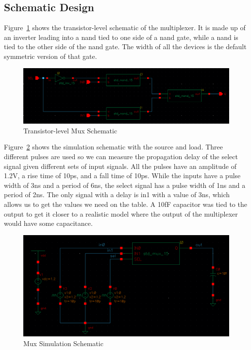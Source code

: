 \documentclass[12pt]{article}
\begin{document}
\subsection{Schematic Design}
Figure~\ref{fig:schem} shows the transistor-level schematic of the multiplexer.
It is made up of an inverter leading into a nand tied to one side of a nand gate,
while a nand is tied to the other side of the nand gate. The width of all the devices is the
default symmetric version of that gate.
\begin{figure}[!htb]
  \centering
  \includegraphics[width=5in]{figures/schem.png}
  \caption{Transistor-level Mux Schematic}\label{fig:schem}
\end{figure}
Figure~\ref{fig:sim} shows the simulation schematic with the source and load. 
Three different pulses are used so we can measure the propagation delay of the select signal
given different sets of input signals. All the pulses have an amplitude of 1.2V, a rise time of
10ps, and a fall time of 10ps.
While the inputs have a pulse width of 3ns and a period of 6ns, the select signal has a pulse width of 1ns and a
period of 2ns. The only signal with a delay is in1 with a value of 3ns, which allows us to get the values we need
on the table.
A 10fF capacitor was tied to the output to get it closer to a realistic model where the output of the
multiplexer would have some capacitance.
\begin{figure}[!htb]
  \centering
  \includegraphics[width=5in]{figures/sim.png}
  \caption{Mux Simulation Schematic}\label{fig:sim}
\end{figure}
\end{document}
